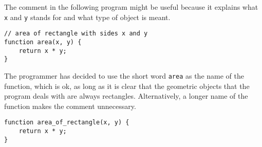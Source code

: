 The comment in the following program might be
useful because it explains what \lstinline{x} and \lstinline{y} stands for and what type of
object is meant. 
\begin{lstlisting}
// area of rectangle with sides x and y
function area(x, y) {
    return x * y;
}
\end{lstlisting}
The programmer has decided to use the short word \lstinline{area} as the name of the function,
which is ok, as long as it is clear that the geometric objects that the program deals with
are always rectangles. Alternatively, a longer name of the function makes the comment
unnecessary.
\begin{lstlisting}
function area_of_rectangle(x, y) {
    return x * y;
}
\end{lstlisting}



      
